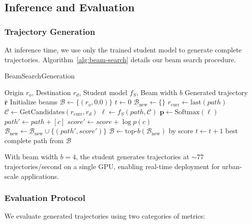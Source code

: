 \subsection{Inference and Evaluation}
\label{sec:method-inference}

\subsubsection{Trajectory Generation}
At inference time, we use only the trained student model to generate complete trajectories. Algorithm~\ref{alg:beam-search} details our beam search procedure.

\begin{algorithm}[t]
\caption{BeamSearchGeneration}
\label{alg:beam-search}
\begin{algorithmic}
\Require Origin $r_o$, Destination $r_d$, Student model $f_S$, Beam width $b$
\Ensure Generated trajectory $\hat{\mathbf{r}}$
\State Initialize beams $\mathcal{B} \gets \{(r_o, 0.0)\}$ 
\State $t \gets 0$
    \State $\mathcal{B}_{\text{new}} \gets \{\}$
        \State $r_{\text{curr}} \gets \text{last}(path)$
        \State $\mathcal{C} \gets \text{GetCandidates}(r_{\text{curr}}, r_d)$ 
        \State $\mathbf{\ell} \gets f_S(path, \mathcal{C})$ 
        \State $\mathbf{p} \gets \text{Softmax}(\mathbf{\ell})$
            \State $path' \gets path + [c]$
            \State $score' \gets score + \log p(c)$
            \State $\mathcal{B}_{\text{new}} \gets \mathcal{B}_{\text{new}} \cup \{(path', score')\}$
        \EndFor
    \EndFor
    \State $\mathcal{B} \gets \text{top-}b(\mathcal{B}_{\text{new}})$ by score
    \State $t \gets t + 1$
\EndWhile
\State \Return best complete path from $\mathcal{B}$
\end{algorithmic}
\end{algorithm}

\begin{remark}
With beam width $b=4$, the student generates trajectories at $\sim$77 trajectories/second on a single GPU, enabling real-time deployment for urban-scale applications.
\end{remark}

\subsubsection{Evaluation Protocol}
\label{sec:method-eval-metrics}
We evaluate generated trajectories using two categories of metrics:

